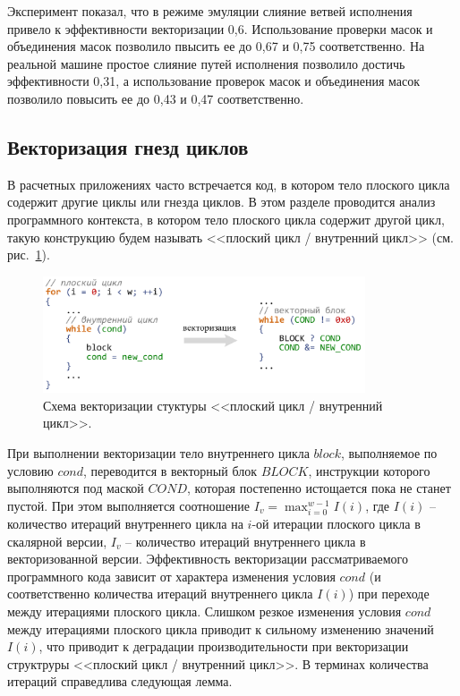 Эксперимент показал, что в режиме эмуляции слияние ветвей исполнения привело к эффективности векторизации 0,6.
Использование проверки масок и объединения масок позволило пвысить ее до 0,67 и 0,75 соответственно.
На реальной машине простое слияние путей исполнения позволило достичь эффективности 0,31, а использование проверок масок и объединения масок позволило повысить ее до 0,43 и 0,47 соответственно.


\subsection{Векторизация гнезд циклов}\label{sec:vec_nests}

В расчетных приложениях часто встречается код, в котором тело плоского цикла содержит другие циклы или гнезда циклов.
В этом разделе проводится анализ программного контекста, в котором тело плоского цикла содержит другой цикл, такую конструкцию будем называть <<плоский цикл / внутренний цикл>> (см. рис.~\ref{fig:vec_flat_loop_nest}).

\begin{figure}[!ht]
\centering
\includegraphics[width=0.85\textwidth]{fig/vec_flat_loop_nest.pdf}
\singlespacing
\caption{Схема векторизации стуктуры <<плоский цикл / внутренний цикл>>.}
\label{fig:vec_flat_loop_nest}
\end{figure}

При выполнении векторизации тело внутреннего цикла $block$, выполняемое по условию $cond$, переводится в векторный блок $BLOCK$, инструкции которого выполняются под маской $COND$, которая постепенно истощается пока не станет пустой.
При этом выполняется соотношение $I_v = \max_{i = 0}^{w - 1}{I(i)}$, где $I(i)$ -- количество итераций внутреннего цикла на $i$-ой итерации плоского цикла в скалярной версии, $I_v$ -- количество итераций внутреннего цикла в векторизованной версии.
Эффективность векторизации рассматриваемого программного кода зависит от характера изменения условия $cond$ (и соответственно количества итераций внутреннего цикла $I(i)$) при переходе между итерациями плоского цикла.
Слишком резкое изменения условия $cond$ между итерациями плоского цикла приводит к сильному изменению значений $I(i)$, что приводит к деградации производительности при векторизации структруры <<плоский цикл / внутренний цикл>>.
В терминах количества итераций справедлива следующая лемма.

